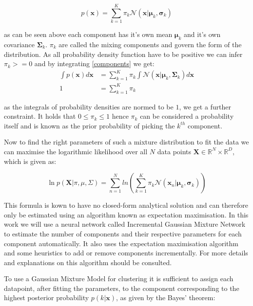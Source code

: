 \documentclass[cic,tc,english]{iiufrgs}
\begin{document}
\begin{equation} \label{components}
p(\bm{x}) = \sum_{k=1}^K \pi_k \mathcal{N}(\bm{x} \vert \bm{\mu}_k, \bm{\sigma}_k) 
\end{equation}

as can be seen above each component has it's own mean $\bm{\mu}_k$ and it's own covariance $\bm{\Sigma}_k$. $\pi_k$ are called the mixing components and govern the form of the distribution. As all probability density function have to be positive we can infer $\pi_k >= 0$ and by integrating \ref{components} we get:
\begin{equation}
\begin{split}
\int p(\bm{x}) d\bm{x} &= \sum_{k=1}^K \pi_k \int \mathcal{N}(\bm{x} \vert \bm{\mu}_k, \bm{\Sigma}_k) d\bm{x} \\
1 &= \sum_{k=1}^K \pi_k
\end{split}
\end{equation}

as the integrals of probability densities are normed to be $1$, we get a further constraint. It holds that $ 0 \leq \pi_k \leq 1$ hence $\pi_k$ can be considered a probability itself and is known as the prior probability of picking the $k^{th}$ component.

Now to find the right parameters of such a mixture distribution to fit the data we can maximise the logarithmic likelihood over all $N$ data points $\bm{X} \in \mathbb{R}^N \times \mathbb{R}^D$, which is given as:

\begin{equation} \label{likelihood}
\ln p(\bm{X} \vert \pi, \mu, \Sigma) = \sum_{n=1}^N ln ( \sum_{k=1}^K \pi_k \mathcal{N}(\bm{x}_n \vert \bm{\mu}_k, \bm{\sigma}_k) )
\end{equation}

This formula is kown to have no closed-form analytical solution \cite{bishop2006pattern} and can therefore only be estimated using an algorithm known as expectation maximisation. In this work we will use a neural network called Incremental Gaussian Mixture Network to estimate the number of components and their respective parameters for each component automatically. It also uses the expectation maximisation algorithm and some heuristics to add or remove components incrementally. For more details and explanations on this algorithm \cite{heinen2010incremental} should be consulted.

To use a Gaussian Mixture Model for clustering it is sufficient to assign each datapoint, after fitting the parameters, to the component corresponding to the highest posterior probability $p(k\vert \bm{x})$, as given by the Bayes' theorem:
\end{document}
